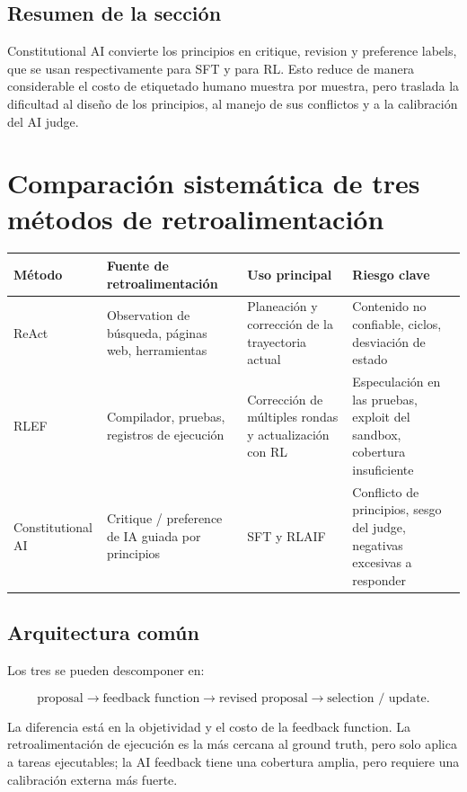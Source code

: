 \documentclass[a4paper]{article}
\begin{document}
\subsection{Resumen de la sección}

Constitutional AI convierte los principios en critique, revision y preference labels, que se usan respectivamente para SFT y para RL. Esto reduce de manera considerable el costo de etiquetado humano muestra por muestra, pero traslada la dificultad al diseño de los principios, al manejo de sus conflictos y a la calibración del AI judge.
\section{Comparación sistemática de tres métodos de retroalimentación}

\begin{table}[H]
\centering
\small
\begin{tabular}{>{\raggedright\arraybackslash}p{2.3cm}>{\raggedright\arraybackslash}p{3.4cm}>{\raggedright\arraybackslash}p{3.2cm}>{\raggedright\arraybackslash}p{4.2cm}}
\toprule
\textbf{Método} & \textbf{Fuente de retroalimentación} & \textbf{Uso principal} & \textbf{Riesgo clave} \\
\midrule
ReAct & Observation de búsqueda, páginas web, herramientas & Planeación y corrección de la trayectoria actual & Contenido no confiable, ciclos, desviación de estado \\
RLEF & Compilador, pruebas, registros de ejecución & Corrección de múltiples rondas y actualización con RL & Especulación en las pruebas, exploit del sandbox, cobertura insuficiente \\
Constitutional AI & Critique / preference de IA guiada por principios & SFT y RLAIF & Conflicto de principios, sesgo del judge, negativas excesivas a responder \\
\bottomrule
\end{tabular}
\end{table}

\subsection{Arquitectura común}

Los tres se pueden descomponer en:

$$
\text{proposal}\rightarrow\text{feedback function}
\rightarrow\text{revised proposal}\rightarrow\text{selection / update}.
$$

La diferencia está en la objetividad y el costo de la feedback function. La retroalimentación de ejecución es la más cercana al ground truth, pero solo aplica a tareas ejecutables; la AI feedback tiene una cobertura amplia, pero requiere una calibración externa más fuerte.
\end{document}
